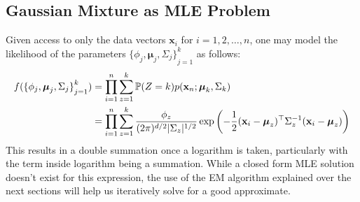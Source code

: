 \subsection{Gaussian Mixture as MLE Problem}
Given access to only the data vectors $\textbf{x}_i$ for $i=1,2,\dots,n$, one may model the likelihood of the parameters ${\{\phi_j,\boldsymbol{\mu}_j,\Sigma_j\}}_{j=1}^k$ as follows:
\begin{align*}
    f({\{\phi_j,\boldsymbol{\mu}_j,\Sigma_j\}}_{j=1}^k) 
    &= \prod_{i=1}^n \sum_{z=1}^k \mathbb{P}(Z=k)p(\mathbf{x}_n;\boldsymbol{\mu}_k,\Sigma_k) \\
    &= \prod_{i=1}^n \sum_{z=1}^k \frac{\phi_z}{(2\pi)^{d/2}|\Sigma_z|^{1/2}} \exp\left( -\frac{1}{2} (\mathbf{x}_i - \boldsymbol{\mu}_z)^\top \Sigma_z^{-1} (\mathbf{x}_i - \boldsymbol{\mu}_z) \right)
\end{align*}
This results in a double summation once a logarithm is taken, particularly with the term inside logarithm being a summation. While a closed form MLE solution doesn't exist for this expression, the use of the EM algorithm explained over the next sections will help us iteratively solve for a good approximate.